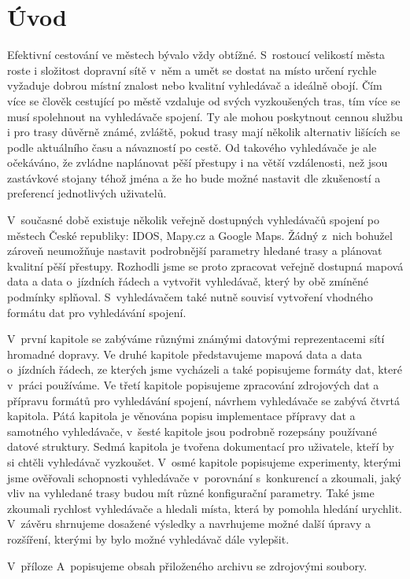 \chapter*{Úvod}

Efektivní cestování ve městech bývalo vždy obtížné. S~rostoucí velikostí města
roste i složitost dopravní sítě v~něm a umět se dostat na místo určení rychle
vyžaduje dobrou místní znalost nebo kvalitní vyhledávač a ideálně obojí. Čím
více se člověk cestující po městě vzdaluje od svých vyzkoušených tras, tím více
se musí spolehnout na vyhledávače spojení. Ty ale mohou poskytnout cennou službu
i pro trasy důvěrně známé, zvláště, pokud trasy mají několik alternativ lišících
se podle aktuálního času a návazností po cestě. Od takového vyhledávače je ale
očekáváno, že zvládne naplánovat pěší přestupy i na větší vzdálenosti, než jsou
zastávkové stojany téhož jména a že ho bude možné nastavit dle zkušeností a
preferencí jednotlivých uživatelů. 

V~současné době existuje několik veřejně dostupných vyhledávačů spojení po
městech České republiky: IDOS, Mapy.cz a Google Maps. Žádný z~nich bohužel
zároveň neumožňuje nastavit podrobnější parametry hledané trasy a plánovat
kvalitní pěší přestupy. Rozhodli jsme se proto zpracovat veřejně dostupná mapová
data a data o~jízdních řádech a vytvořit vyhledávač, který by obě zmíněné
podmínky splňoval. S~vyhledávačem také nutně souvisí vytvoření vhodného formátu
dat pro vyhledávání spojení.

V~první kapitole se zabýváme různými známými datovými reprezentacemi sítí hromadné
dopravy. Ve druhé kapitole představujeme mapová data a data o~jízdních řádech,
ze kterých jsme vycházeli a také popisujeme formáty dat, které v~práci
používáme. Ve třetí kapitole popisujeme zpracování zdrojových dat a přípravu
formátů pro vyhledávání spojení, návrhem vyhledávače se zabývá čtvrtá kapitola.
Pátá kapitola je věnována popisu implementace přípravy dat a samotného
vyhledávače, v~šesté kapitole jsou podrobně rozepsány používané datové
struktury. Sedmá kapitola je tvořena dokumentací pro uživatele, kteří by si
chtěli vyhledávač vyzkoušet. V~osmé kapitole popisujeme experimenty, kterými
jsme ověřovali schopnosti vyhledávače v~porovnání s~konkurencí a zkoumali, jaký
vliv na vyhledané trasy budou mít různé konfigurační parametry. Také jsme
zkoumali rychlost vyhledávače a hledali místa, která by pomohla hledání
urychlit. V~závěru shrnujeme dosažené výsledky a navrhujeme možné další úpravy
a rozšíření, kterými by bylo možné vyhledávač dále vylepšit.

V~příloze A~popisujeme obsah přiloženého archivu se zdrojovými soubory.
